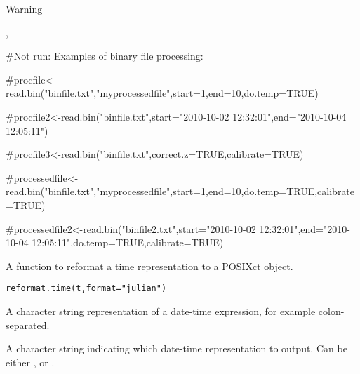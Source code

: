 \documentclass[a4paper]{book}
\begin{document}
%
\begin{Section}{Warning}
\end{Section}
%
\begin{SeeAlso}\relax
{},  
\end{SeeAlso}
%
\begin{Examples}
\begin{ExampleCode}

#Not run: Examples of binary file processing:

#procfile<-read.bin("binfile.txt","myprocessedfile",start=1,end=10,do.temp=TRUE)

#procfile2<-read.bin("binfile.txt",start="2010-10-02 12:32:01",end="2010-10-04 12:05:11")

#procfile3<-read.bin("binfile.txt",correct.z=TRUE,calibrate=TRUE)

#processedfile<-read.bin("binfile.txt","myprocessedfile",start=1,end=10,do.temp=TRUE,calibrate=TRUE)

#processedfile2<-read.bin("binfile2.txt",start="2010-10-02 12:32:01",end="2010-10-04 12:05:11",do.temp=TRUE,calibrate=TRUE)
\end{ExampleCode}
\end{Examples}
%
\begin{Description}\relax
A function to reformat a time representation to a POSIXct object.
\end{Description}
%
\begin{Usage}
\begin{verbatim}
reformat.time(t,format="julian")
\end{verbatim}
\end{Usage}
%
\begin{Arguments}
\begin{ldescription}
\item[\code{t}] A character string representation of a date-time expression, for example colon-separated.
\item[\code{format}] A character string indicating which date-time representation to output.  Can be either ,  or .
\end{ldescription}
\end{Arguments}
\end{document}
